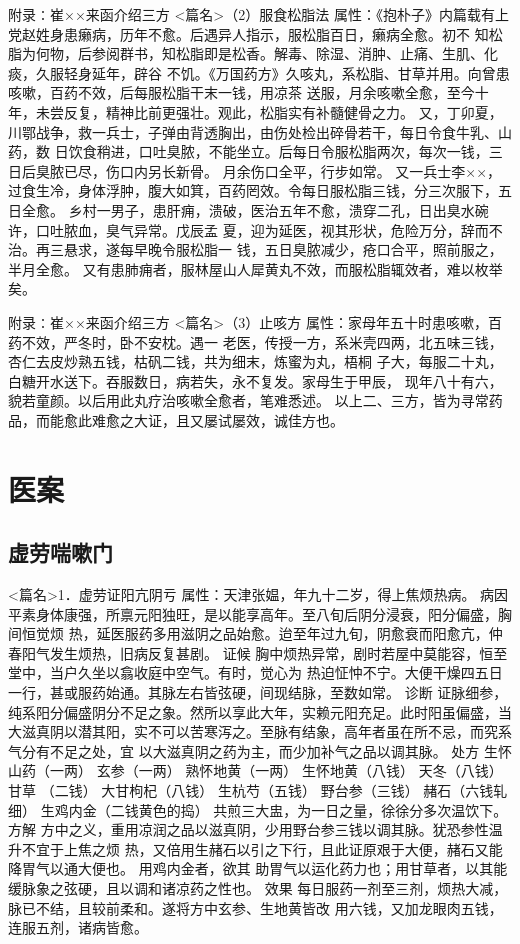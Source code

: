 \documentclass[a4paper,12pt,UTF8,twoside]{ctexbook}
\begin{document}
附录∶崔××来函介绍三方
<篇名>（2）服食松脂法
属性：《抱朴子》内篇载有上党赵姓身患癞病，历年不愈。后遇异人指示，服松脂百日，癞病全愈。初不 
知松脂为何物，后参阅群书，知松脂即是松香。解毒、除湿、消肿、止痛、生肌、化痰，久服轻身延年，辟谷 
不饥。《万国药方》久咳丸，系松脂、甘草并用。向曾患咳嗽，百药不效，后每服松脂干末一钱，用凉茶 
送服，月余咳嗽全愈，至今十年，未尝反复，精神比前更强壮。观此，松脂实有补髓健骨之力。 
又，丁卯夏，川鄂战争，救一兵士，子弹由背透胸出，由伤处检出碎骨若干，每日令食牛乳、山药，数 
日饮食稍进，口吐臭脓，不能坐立。后每日令服松脂两次，每次一钱，三日后臭脓已尽，伤口内另长新骨。 
月余伤口全平，行步如常。 
又一兵士李××，过食生冷，身体浮肿，腹大如箕，百药罔效。令每日服松脂三钱，分三次服下，五日全愈。 
乡村一男子，患肝痈，溃破，医治五年不愈，溃穿二孔，日出臭水碗许，口吐脓血，臭气异常。戊辰孟 
夏，迎为延医，视其形状，危险万分，辞而不治。再三悬求，遂每早晚令服松脂一 
钱，五日臭脓减少，疮口合平，照前服之，半月全愈。 
又有患肺痈者，服林屋山人犀黄丸不效，而服松脂辄效者，难以枚举矣。 

附录∶崔××来函介绍三方
<篇名>（3）止咳方
属性：家母年五十时患咳嗽，百药不效，严冬时，卧不安枕。遇一 
老医，传授一方，系米壳四两，北五味三钱，杏仁去皮炒熟五钱，枯矾二钱，共为细末，炼蜜为丸，梧桐 
子大，每服二十丸，白糖开水送下。吞服数日，病若失，永不复发。家母生于甲辰， 
现年八十有六，貌若童颜。以后用此丸疗治咳嗽全愈者，笔难悉述。 
以上二、三方，皆为寻常药品，而能愈此难愈之大证，且又屡试屡效，诚佳方也。 

\part{医案}
\chapter{虚劳喘嗽门}
<篇名>1．虚劳证阳亢阴亏
属性：天津张媪，年九十二岁，得上焦烦热病。 
病因 平素身体康强，所禀元阳独旺，是以能享高年。至八旬后阴分浸衰，阳分偏盛，胸间恒觉烦 
热，延医服药多用滋阴之品始愈。迨至年过九旬，阴愈衰而阳愈亢，仲春阳气发生烦热，旧病反复甚剧。 
证候 胸中烦热异常，剧时若屋中莫能容，恒至堂中，当户久坐以翕收庭中空气。有时，觉心为 
热迫怔忡不宁。大便干燥四五日一行，甚或服药始通。其脉左右皆弦硬，间现结脉，至数如常。 
诊断 证脉细参，纯系阳分偏盛阴分不足之象。然所以享此大年，实赖元阳充足。此时阳虽偏盛，当 
大滋真阴以潜其阳，实不可以苦寒泻之。至脉有结象，高年者虽在所不忌，而究系气分有不足之处，宜 
以大滋真阴之药为主，而少加补气之品以调其脉。 
处方 生怀山药（一两） 玄参（一两） 熟怀地黄（一两） 生怀地黄（八钱） 天冬（八钱） 甘草 
（二钱） 大甘枸杞（八钱） 生杭芍（五钱） 野台参（三钱） 赭石（六钱轧细） 生鸡内金（二钱黄色的捣） 
共煎三大盅，为一日之量，徐徐分多次温饮下。 
方解 方中之义，重用凉润之品以滋真阴，少用野台参三钱以调其脉。犹恐参性温升不宜于上焦之烦 
热，又倍用生赭石以引之下行，且此证原艰于大便，赭石又能降胃气以通大便也。 
用鸡内金者，欲其 
助胃气以运化药力也；用甘草者，以其能缓脉象之弦硬，且以调和诸凉药之性也。 
效果 每日服药一剂至三剂，烦热大减，脉已不结，且较前柔和。遂将方中玄参、生地黄皆改 
用六钱，又加龙眼肉五钱，连服五剂，诸病皆愈。 
\end{document}
